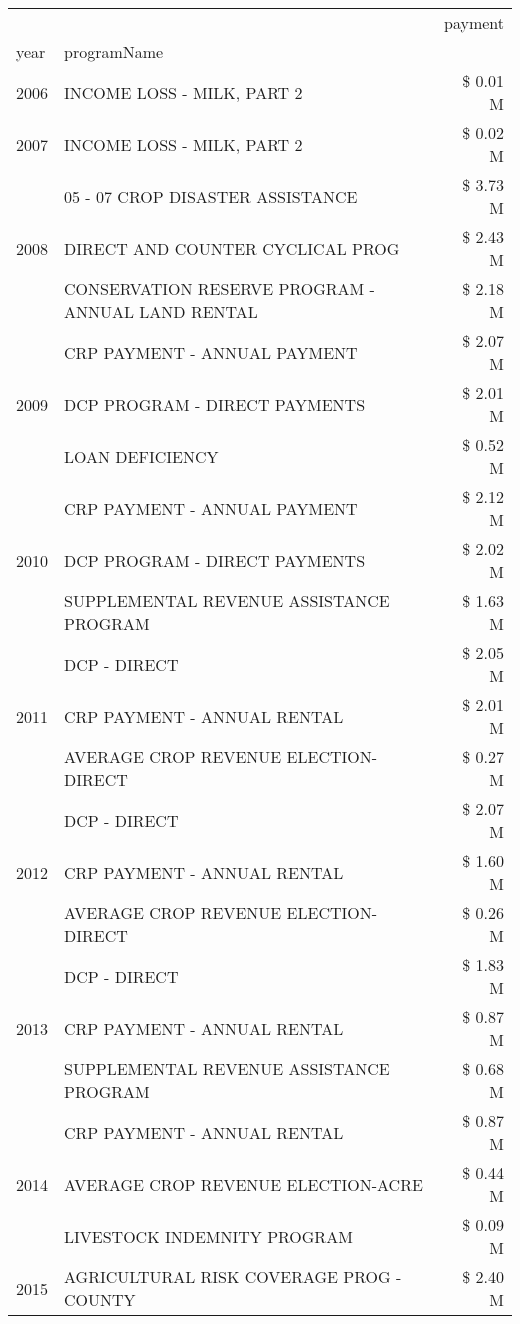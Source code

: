 \begin{tabular}{llr}
\toprule
 &  & payment \\
year & programName &  \\
\midrule
2006 & INCOME LOSS - MILK, PART 2 & \$ 0.01 M \\
\cline{1-3}
2007 & INCOME LOSS - MILK, PART 2 & \$ 0.02 M \\
\cline{1-3}
\multirow[t]{3}{*}{2008} & 05 - 07 CROP DISASTER ASSISTANCE & \$ 3.73 M \\
 & DIRECT AND COUNTER CYCLICAL PROG & \$ 2.43 M \\
 & CONSERVATION RESERVE PROGRAM - ANNUAL LAND RENTAL & \$ 2.18 M \\
\cline{1-3}
\multirow[t]{3}{*}{2009} & CRP PAYMENT - ANNUAL PAYMENT & \$ 2.07 M \\
 & DCP PROGRAM - DIRECT PAYMENTS & \$ 2.01 M \\
 & LOAN DEFICIENCY & \$ 0.52 M \\
\cline{1-3}
\multirow[t]{3}{*}{2010} & CRP PAYMENT - ANNUAL PAYMENT & \$ 2.12 M \\
 & DCP PROGRAM - DIRECT PAYMENTS & \$ 2.02 M \\
 & SUPPLEMENTAL REVENUE ASSISTANCE PROGRAM & \$ 1.63 M \\
\cline{1-3}
\multirow[t]{3}{*}{2011} & DCP - DIRECT & \$ 2.05 M \\
 & CRP PAYMENT - ANNUAL RENTAL & \$ 2.01 M \\
 & AVERAGE CROP REVENUE ELECTION-DIRECT & \$ 0.27 M \\
\cline{1-3}
\multirow[t]{3}{*}{2012} & DCP - DIRECT & \$ 2.07 M \\
 & CRP PAYMENT - ANNUAL RENTAL & \$ 1.60 M \\
 & AVERAGE CROP REVENUE ELECTION-DIRECT & \$ 0.26 M \\
\cline{1-3}
\multirow[t]{3}{*}{2013} & DCP - DIRECT & \$ 1.83 M \\
 & CRP PAYMENT - ANNUAL RENTAL & \$ 0.87 M \\
 & SUPPLEMENTAL REVENUE ASSISTANCE PROGRAM & \$ 0.68 M \\
\cline{1-3}
\multirow[t]{3}{*}{2014} & CRP PAYMENT - ANNUAL RENTAL & \$ 0.87 M \\
 & AVERAGE CROP REVENUE ELECTION-ACRE & \$ 0.44 M \\
 & LIVESTOCK INDEMNITY PROGRAM & \$ 0.09 M \\
\cline{1-3}
\multirow[t]{3}{*}{2015} & AGRICULTURAL RISK COVERAGE PROG - COUNTY & \$ 2.40 M \\

\end{tabular}
